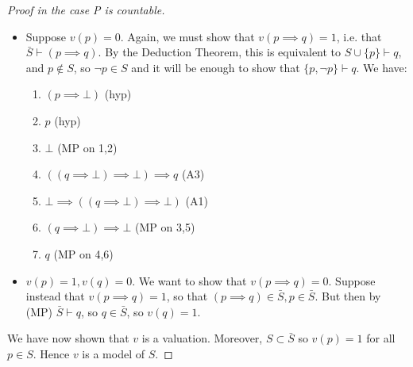 \documentclass[10pt,a4paper]{article}
\begin{document}
\begin{proof}[Proof in the case P is countable]
\begin{itemize}
\item[Case 2.] Suppose $v(p) = 0$. Again, we must show that $v(p \implies q) = 1$, i.e. that $\bar{S} \vdash (p \implies q)$. By the Deduction Theorem, this is equivalent to $S\cup \{p\} \vdash q$, and $p \notin S$, so $\neg p \in S$ and it will be enough to show that $\{p, \neg p\} \vdash q$. We have:
\begin{enumerate}
\item $(p \implies \bot)$ \hfill (hyp)
\item $p$ \hfill (hyp)
\item $\bot$ \hfill (MP on 1,2)
\item $((q \implies \bot)\implies \bot) \implies q$ \hfill (A3)
\item $\bot \implies ((q\implies \bot)\implies \bot)$ \hfill (A1)
\item $(q \implies \bot) \implies \bot$ \hfill (MP on 3,5)
\item $q$ \hfill (MP on 4,6)
\end{enumerate}
\item[Case 3.] $v(p) = 1, v(q) = 0$. We want to show that $v(p \implies q) = 0$. Suppose instead that $v(p \implies q) = 1$, so that $(p \implies q) \in \bar{S}, p \in \bar{S}$. But then by (MP) $\bar{S} \vdash q$, so $q \in \bar{S}$, so $v(q) = 1$. \contr
\end{itemize}
We have now shown that $v$ is a valuation. Moreover, $S \subset \bar{S}$ so $v(p) =1$ for all $p \in S$. Hence $v$ is a model of $S$.
\end{proof}
\end{document}

